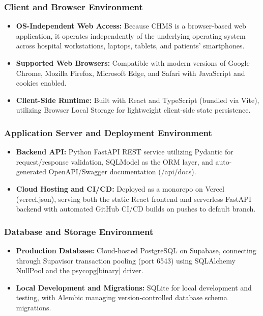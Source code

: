 \documentclass[11pt,a4paper]{article}
\begin{document}
\subsubsection{Client and Browser Environment}
\begin{itemize}
    \item \textbf{OS-Independent Web Access:} Because CHMS is a browser-based web application, it operates independently of the underlying operating system across hospital workstations, laptops, tablets, and patients' smartphones.

    \item \textbf{Supported Web Browsers:} Compatible with modern versions of Google Chrome, Mozilla Firefox, Microsoft Edge, and Safari with JavaScript and cookies enabled.

    \item \textbf{Client-Side Runtime:} Built with React and TypeScript (bundled via Vite), utilizing Browser Local Storage for lightweight client-side state persistence.
\end{itemize}

\subsubsection{Application Server and Deployment Environment}
\begin{itemize}
    \item \textbf{Backend API:} Python FastAPI REST service utilizing Pydantic for request/response validation, SQLModel as the ORM layer, and auto-generated OpenAPI/Swagger documentation (/api/docs).

    \item \textbf{Cloud Hosting and CI/CD:} Deployed as a monorepo on Vercel (vercel.json), serving both the static React frontend and serverless FastAPI backend with automated GitHub CI/CD builds on pushes to default branch.
\end{itemize}

\subsubsection{Database and Storage Environment}
\begin{itemize}
    \item \textbf{Production Database:} Cloud-hosted PostgreSQL on Supabase, connecting through Supavisor transaction pooling (port 6543) using SQLAlchemy NullPool and the psycopg[binary] driver.

    \item \textbf{Local Development and Migrations:} SQLite for local development and testing, with Alembic managing version-controlled database schema migrations.
\end{itemize}
\end{document}

